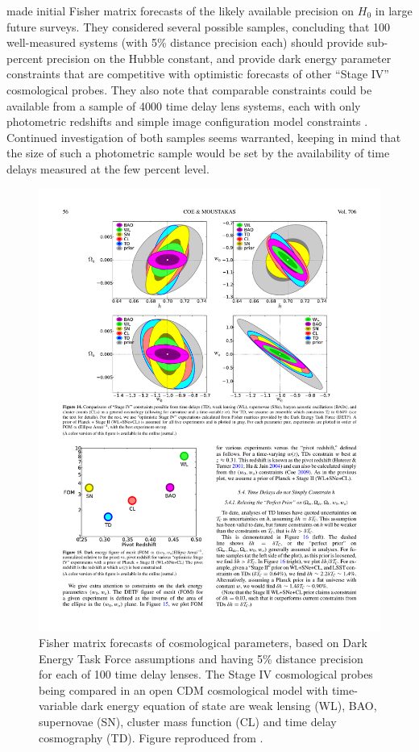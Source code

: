\citet{C+M09b} made initial Fisher matrix forecasts of the likely
available precision on $H_0$ in large future surveys. They considered
several possible samples, concluding that 100 well-measured systems
(with 5\% distance precision each) should provide sub-percent precision
on the Hubble constant, and provide  dark energy parameter constraints
that are competitive with optimistic forecasts of other ``Stage IV''
cosmological probes. They also note that comparable constraints could be
available from a sample of 4000 time delay lens systems, each with only
photometric redshifts and simple image configuration model constraints
\citep[following][]{Ogu07b,P+J10}.  Continued investigation of both samples
seems warranted, keeping in mind that the size of such a photometric
sample would be set by the availability of time delays measured at the
few percent level.

\begin{figure}[!ht]
\centering\includegraphics[width=0.9\linewidth]{figures/Coe+Moustakas09_fig14.pdf}
\caption{Fisher matrix forecasts of cosmological parameters, based on
Dark Energy Task Force assumptions and having 5\% distance precision
for each of 100 time delay lenses. The Stage IV cosmological probes
being compared in an  open CDM cosmological model with time-variable
dark energy equation of state are weak lensing (WL), BAO, supernovae
(SN), cluster mass function (CL) and time delay cosmography (TD).
Figure reproduced from \citet{C+M09b}.}
\label{fig:fisher}
\end{figure}



